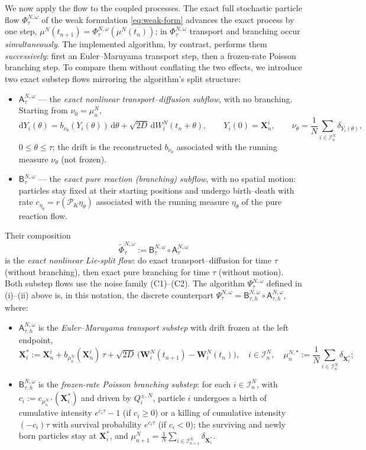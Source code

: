 \documentclass[a4paper,fleqn]{cas-sc}
\theoremstyle{definition}
\theoremstyle{remark}
\begin{document}
We now apply the flow to the coupled processes. The exact full stochastic
particle flow $\Phi^{N,\omega}_\tau$ of the weak formulation
\eqref{eq:weak-form} advances the exact process by one step,
$\mu^N(t_{n+1})=\Phi^{N,\omega}_\tau(\mu^N(t_n))$; in $\Phi^{N,\omega}_\tau$
transport and branching occur \emph{simultaneously}. The implemented algorithm,
by contrast, performs them \emph{successively}: first an Euler--Maruyama
transport step, then a frozen-rate Poisson branching step. To compare them
without conflating the two effects, we introduce two exact substep flows
mirroring the algorithm's split structure:
\begin{itemize}
\item $\mathsf A^{N,\omega}_\tau$ --- the \emph{exact nonlinear transport--diffusion
subflow}, with no branching. Starting from $\nu_0=\mu^N_n$,
\[
\mathrm dY_i(\theta)=b_{\nu_\theta}(Y_i(\theta))\,\mathrm d\theta
+\sqrt{2D}\,\mathrm dW^N_i(t_n+\theta),
\qquad Y_i(0)=\mathbf X^i_n,
\qquad
\nu_\theta=\frac1N\sum_{i\in\mathcal I^N_n}\delta_{Y_i(\theta)},
\]
$0\le\theta\le\tau$; the drift is the reconstructed $b_{\nu_\theta}$ associated
with the running measure $\nu_\theta$ (not frozen).
\item $\mathsf B^{N,\omega}_\tau$ --- the \emph{exact pure reaction (branching)
subflow}, with no spatial motion: particles stay fixed at their starting
positions and undergo birth--death with rate $c_{\eta_\theta}
=r(\mathcal P_K\eta_\theta)$ associated with the running measure
$\eta_\theta$ of the pure reaction flow.
\end{itemize}
Their composition
\[
\widetilde\Phi^{N,\omega}_\tau:=\mathsf B^{N,\omega}_\tau\circ\mathsf A^{N,\omega}_\tau
\]
is the \emph{exact nonlinear Lie-split flow}: do exact transport--diffusion for
time $\tau$ (without branching), then exact pure branching for time $\tau$
(without motion). Both substep flows use the noise family (C1)--(C2). The
algorithm $\Psi^{N,\omega}_\tau$ defined in (i)--(ii) above is, in this notation,
the discrete counterpart
$\Psi^{N,\omega}_\tau=\mathsf B^{N,\omega}_{\tau,h}\circ\mathsf A^{N,\omega}_{\tau,h}$,
where:
\begin{itemize}
\item[(i)] $\mathsf A^{N,\omega}_{\tau,h}$ is the \emph{Euler--Maruyama transport
substep} with drift frozen at the left endpoint,
\[
\mathbf X^*_i
:=\mathbf X^i_n+b_{\mu^N_n}(\mathbf X^i_n)\,\tau
+\sqrt{2D}\,\bigl(\mathbf W^N_i(t_{n+1})-\mathbf W^N_i(t_n)\bigr),
\quad i\in\mathcal I^N_n,
\quad
\mu^{N,*}_n:=\frac1N\sum_{i\in\mathcal I^N_n}\delta_{\mathbf X^*_i};
\]
\item[(ii)] $\mathsf B^{N,\omega}_{\tau,h}$ is the \emph{frozen-rate Poisson
branching substep}: for each $i\in\mathcal I^N_n$, with
$c_i:=c_{\mu^{N,*}_n}(\mathbf X^*_i)$ and driven by $Q^{\pm,N}_i$, particle
$i$ undergoes a birth of cumulative intensity $e^{c_i\tau}-1$ (if $c_i\ge0$) or a
killing of cumulative intensity $(-c_i)\tau$ with survival probability
$e^{c_i\tau}$ (if $c_i<0$); the surviving and newly born particles stay at
$\mathbf X^*_i$, and
$\mu^N_{n+1}=\frac1N\sum_{i\in\mathcal I^N_{n+1}}\delta_{\mathbf X^*_i}$.
\end{itemize}
\end{document}
